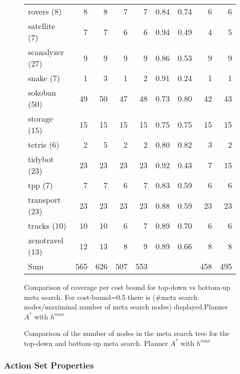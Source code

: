 \begin{figure}[ht]
\begin{tabular}{l||rr||rr|rr||rr}
		rovers (8) & 8 & 8 & 7 & 7 & 0.84 & 0.74 & 6 & 6\\
		satellite (7) & 7 & 7 & 6 & 6 & 0.94 & 0.49 & 4 & 5\\
		scanalyzer (27) & 9 & 9 & 9 & 9 & 0.86 & 0.53 & 9 & 9\\
		snake (7) & 1 & 3 & 1 & 2 & 0.91 & 0.24 & 1 & 1\\
		sokoban (50) & 49 & 50 & 47 & 48 & 0.73 & 0.80 & 42 & 43\\
		storage (15) & 15 & 15 & 15 & 15 & 0.75 & 0.75 & 15 & 15\\
		tetris (6) & 2 & 5 & 2 & 2 & 0.80 & 0.82 & 3 & 2\\
		tidybot (23) & 23 & 23 & 23 & 23 & 0.92 & 0.43 & 7 & 15\\
		tpp (7) & 7 & 7 & 6 & 7 & 0.83 & 0.59 & 6 & 6\\
		transport (23) & 23 & 23 & 23 & 23 & 0.88 & 0.59 & 23 & 23\\
		trucks (10) & 10 & 10 & 6 & 7 & 0.89 & 0.70 & 6 & 6\\
		zenotravel (13) & 12 & 13 & 8 & 9 & 0.89 & 0.66 & 8 & 8\\\hline
		Sum & 565 & 626 & 507 & 553 &  &  & 458 & 495\\
	\end{tabular}
	\caption{Comparison of coverage per cost bound for top-down vs bottom-up meta search.
	For cost-bound=0.5 there is (\#meta search nodes/maximinal number of meta search nodes) displayed.Planner $A^*$ with $h^{max}$}
\end{figure}


\begin{figure}[ht]

\caption{Comparison of the number of nodes in the meta search tree for the top-down and bottom-up meta search.
	Planner $A^*$ with $h^{max}$}
\end{figure}


\FloatBarrier
\newpage
\subsubsection*{Action Set Properties}

